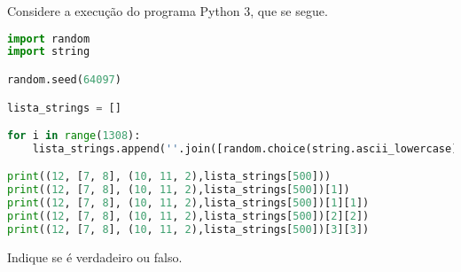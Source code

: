 \documentclass[12pt,varwidth=16cm,border=17pt]{standalone}
\begin{document}
Considere a execução do programa Python 3, que se segue. 

\begin{lstlisting}[language=Python]
import random
import string

random.seed(64097)

lista_strings = []

for i in range(1308):
	lista_strings.append(''.join([random.choice(string.ascii_lowercase) for i in range(6)]))

print((12, [7, 8], (10, 11, 2),lista_strings[500]))
print((12, [7, 8], (10, 11, 2),lista_strings[500])[1])
print((12, [7, 8], (10, 11, 2),lista_strings[500])[1][1])
print((12, [7, 8], (10, 11, 2),lista_strings[500])[2][2])
print((12, [7, 8], (10, 11, 2),lista_strings[500])[3][3])
\end{lstlisting}

Indique se é verdadeiro ou falso.
\end{document}
